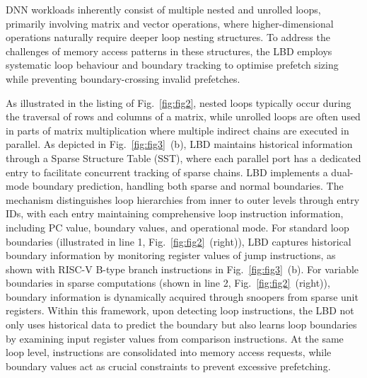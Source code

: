 DNN workloads inherently consist of multiple nested and unrolled loops, primarily involving matrix and vector operations, where higher-dimensional operations naturally require deeper loop nesting structures. To address the challenges of memory access patterns in these structures, the LBD employs systematic loop behaviour and boundary tracking to optimise prefetch sizing while preventing boundary-crossing invalid prefetches. 

As illustrated in the listing of Fig.~\ref{fig:fig2}, nested loops typically occur during the traversal of rows and columns of a matrix, while unrolled loops are often used in parts of matrix multiplication where multiple indirect chains are executed in parallel. 
As depicted in Fig.~\ref{fig:fig3}~(b), LBD maintains historical information through a Sparse Structure Table (SST), where each parallel port has a dedicated entry to facilitate concurrent tracking of sparse chains. LBD implements a dual-mode boundary prediction, handling both sparse and normal boundaries. The mechanism distinguishes loop hierarchies from inner to outer levels through entry IDs, with each entry maintaining comprehensive loop instruction information, including PC value, boundary values, and operational mode. 
For standard loop boundaries (illustrated in line 1, Fig.~\ref{fig:fig2}~(right)), LBD captures historical boundary information by monitoring register values of jump instructions, as shown with RISC-V B-type branch instructions in Fig.~\ref{fig:fig3}~(b). 
For variable boundaries in sparse computations (shown in line 2, Fig.~\ref{fig:fig2}~(right)), boundary information is dynamically acquired through snoopers from sparse unit registers.
Within this framework, upon detecting loop instructions, the LBD not only uses historical data to predict the boundary but also learns loop boundaries by examining input register values from comparison instructions. 
At the same loop level, instructions are consolidated into memory access requests, while boundary values act as crucial constraints to prevent excessive prefetching. 





